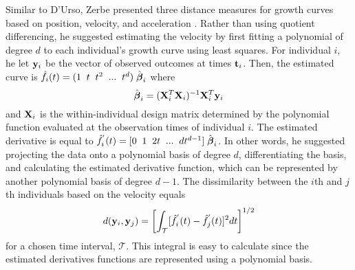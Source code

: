 Similar to D'Urso, Zerbe presented three distance measures for growth curves based on position, velocity, and acceleration \cite{zerbe1979,schneiderman1993}. Rather than using quotient differencing, he suggested estimating the velocity by first fitting a polynomial of degree $d$ to each individual's growth curve using least squares. For individual $i$, he let $\mathbf y_{i}$ be the vector of observed outcomes at times $\mathbf t_{i}$. Then, the estimated curve is $\hat{f}_{i}(t) = (1\;\; t\;\;t^{2}\;\;...\;\;t^{d})\;\hat{\boldsymbol\beta}_{i}$ where 
$$\hat{\boldsymbol\beta}_{i} = (\mathbf X^{T}_{i}\mathbf X_{i})^{-1}\mathbf X^{T}_{i}\mathbf y_{i}$$
and $\mathbf X_{i}$ is the within-individual design matrix determined by the polynomial function evaluated at the observation times of individual $i$. The estimated derivative is equal to
$\hat{f}_{i}^{'}(t) = [0\;\; 1\;\;2t\;\;...\;\;dt^{d-1}]\;\hat{\boldsymbol\beta}_{i}$. In other words, he suggested projecting the data onto a polynomial basis of degree $d$, differentiating the basis, and calculating the estimated derivative function, which can be represented by another polynomial basis of degree $d-1$. The dissimilarity between the $i$th and $j$th individuals based on the velocity equals
$$d(\mathbf y_{i},\mathbf y_{j}) =\left[ \int_{\mathcal{T}} [\hat{f}^{'}_{i}(t)-\hat{f}^{'}_{j}(t)]^{2}dt\right]^{1/2}$$
for a chosen time interval, $\mathcal{T}$. This integral is easy to calculate since the estimated derivatives functions are represented using a polynomial basis.

